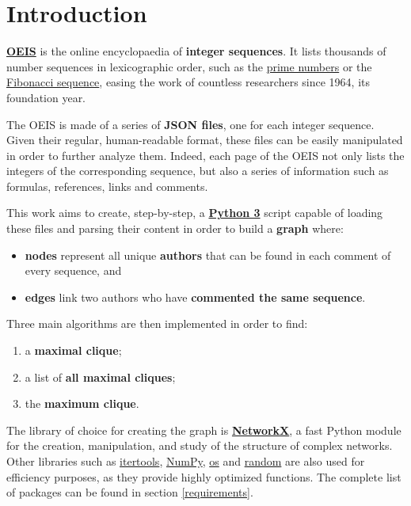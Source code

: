 \documentclass[11pt]{article}
\begin{document}


\tableofcontents

\section{Introduction}\label{introduction}

\textbf{\href{https://oeis.org/}{OEIS}} is the online encyclopaedia of
\textbf{integer sequences}. It lists thousands of number sequences in
lexicographic order, such as the \href{http://oeis.org/A000040}{prime
numbers} or the \href{http://oeis.org/A000045}{Fibonacci sequence},
easing the work of countless researchers since 1964, its foundation
year.

The OEIS is made of a series of \textbf{JSON files}, one for each
integer sequence. Given their regular, human-readable format, these
files can be easily manipulated in order to further analyze them.
Indeed, each page of the OEIS not only lists the integers of the
corresponding sequence, but also a series of information such as
formulas, references, links and comments.

This work aims to create, step-by-step, a
\textbf{\href{https://www.python.org/}{Python 3}} script capable of
loading these files and parsing their content in order to build a
\textbf{graph} where:

\begin{itemize}
    \item \textbf{nodes} represent all unique
\textbf{authors} that can be found in each comment of every sequence,
and \item \textbf{edges} link two authors who have \textbf{commented the
same sequence}.
\end{itemize}

Three main algorithms are then implemented in order to find:

\begin{enumerate}
    \item a
\textbf{maximal clique}; \item a list of \textbf{all maximal cliques}; \item the \textbf{maximum clique}.
\end{enumerate}

The library of choice for creating the graph is
\textbf{\href{https://networkx.org/}{NetworkX}}, a fast Python module
for the creation, manipulation, and study of the structure of complex
networks. Other libraries such as
\href{https://docs.python.org/3/library/itertools.html}{itertools},
\href{https://numpy.org/}{NumPy},
\href{https://docs.python.org/3/library/os.html}{os} and
\href{https://docs.python.org/3/library/random.html}{random} are also
used for efficiency purposes, as they provide highly optimized
functions. The complete list of packages can be found in section \ref{requirements}.
\end{document}
